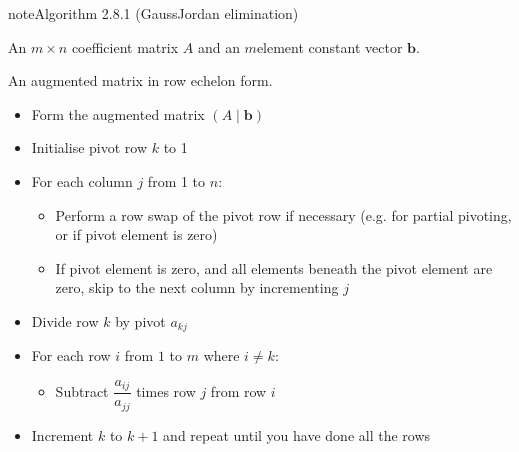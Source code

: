 \documentclass[letterpaper,10pt,english]{jupyterBook}
\begin{document}
\ignorespaces \label{_pages/2.5_Gauss_Jordan_elimination:gje-algorithm}
\begin{sphinxadmonition}{note}{Algorithm 2.8.1 (Gauss\sphinxhyphen{}Jordan elimination)}



\sphinxAtStartPar
{} An \(m \times n\) coefficient matrix \(A\) and an \(m\)\sphinxhyphen{}element constant vector \(\mathbf{b}\).

\sphinxAtStartPar
{} An augmented matrix in row echelon form.
\begin{itemize}
\item {} 
\sphinxAtStartPar
Form the augmented matrix \(( A \mid \mathbf{b} )\)

\item {} 
\sphinxAtStartPar
Initialise pivot row \(k\) to 1

\item {} 
\sphinxAtStartPar
For each column \(j\) from 1 to \(n\):
\begin{itemize}
\item {} 
\sphinxAtStartPar
Perform a row swap of the pivot row if necessary (e.g. for partial pivoting, or if pivot element is zero)

\item {} 
\sphinxAtStartPar
If pivot element is zero, and all elements beneath the pivot element are zero, skip to the next column by incrementing \(j\)

\end{itemize}

\item {} 
\sphinxAtStartPar
Divide row \(k\) by pivot \(a_{kj}\)

\item {} 
\sphinxAtStartPar
For each row \(i\) from \(1\) to \(m\) where \(i \neq k\):
\begin{itemize}
\item {} 
\sphinxAtStartPar
Subtract \(\dfrac{a_{ij}}{a_{jj}}\) times row \(j\) from row \(i\)

\end{itemize}

\item {} 
\sphinxAtStartPar
Increment \(k\) to \(k+1\) and repeat until you have done all the rows

\end{itemize}
\end{sphinxadmonition}
\end{document}
